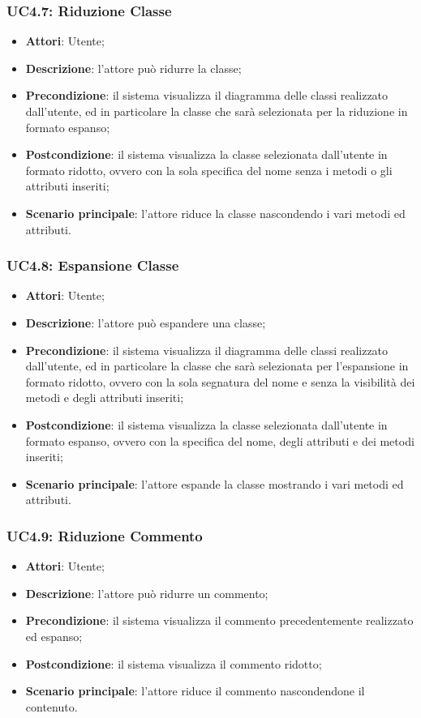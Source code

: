 \subsubsection{UC4.7: Riduzione Classe}
\label{UC4.7}
\begin{itemize}
	\item \textbf{Attori}: Utente;
	\item \textbf{Descrizione}: l'attore può ridurre la classe;
	\item \textbf{Precondizione}: il sistema visualizza il diagramma delle classi realizzato dall'utente, ed in particolare la classe che sarà selezionata per la riduzione in formato espanso;
	\item \textbf{Postcondizione}: il sistema visualizza la classe selezionata dall'utente in formato ridotto, ovvero con la sola specifica del nome senza i metodi o gli attributi inseriti;
	\item \textbf{Scenario principale}: l'attore riduce la classe nascondendo i vari metodi ed attributi.
\end{itemize}

\subsubsection{UC4.8: Espansione Classe}
\label{UC4.8}
\begin{itemize}
	\item \textbf{Attori}: Utente;
	\item \textbf{Descrizione}: l'attore può espandere una classe;
	\item \textbf{Precondizione}: il sistema visualizza il diagramma delle classi realizzato dall'utente, ed in particolare la classe che sarà selezionata per l'espansione in formato ridotto, ovvero con la sola segnatura del nome e senza la visibilità dei metodi e degli attributi inseriti;
	\item \textbf{Postcondizione}: il sistema visualizza la classe selezionata dall'utente in formato espanso, ovvero con la specifica del nome, degli attributi e dei metodi inseriti;
	\item \textbf{Scenario principale}: l'attore espande la classe mostrando i vari metodi ed attributi.
\end{itemize}

\subsubsection{UC4.9: Riduzione Commento}
\label{UC4.9}
\begin{itemize}
	\item \textbf{Attori}: Utente;
	\item \textbf{Descrizione}: l'attore può ridurre un commento;
	\item \textbf{Precondizione}: il sistema visualizza il commento precedentemente realizzato ed espanso;
	\item \textbf{Postcondizione}: il sistema visualizza il commento ridotto;
	\item \textbf{Scenario principale}: l'attore riduce il commento nascondendone il contenuto.
\end{itemize}

